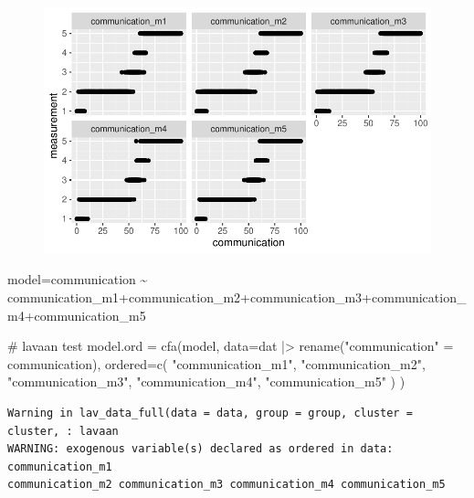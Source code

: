 \documentclass[
  letterpaper,
  DIV=11,
  numbers=noendperiod]{scrreprt}
\newenvironment{Shaded}{\begin{snugshade}}{\end{snugshade}}
\newcommand{\AttributeTok}[1]{\textcolor[rgb]{0.40,0.45,0.13}{#1}}
\newcommand{\CommentTok}[1]{\textcolor[rgb]{0.37,0.37,0.37}{#1}}
\newcommand{\FunctionTok}[1]{\textcolor[rgb]{0.28,0.35,0.67}{#1}}
\newcommand{\NormalTok}[1]{\textcolor[rgb]{0.00,0.23,0.31}{#1}}
\newcommand{\OtherTok}[1]{\textcolor[rgb]{0.00,0.23,0.31}{#1}}
\newcommand{\SpecialCharTok}[1]{\textcolor[rgb]{0.37,0.37,0.37}{#1}}
\newcommand{\StringTok}[1]{\textcolor[rgb]{0.13,0.47,0.30}{#1}}
\begin{document}
\begin{figure}[H]

{\centering \includegraphics{./latent-variable-regression_files/figure-pdf/unnamed-chunk-5-1.pdf}

}

\end{figure}

\begin{Shaded}
\begin{Highlighting}[]
\NormalTok{model}\OtherTok{=}\StringTok{\textquotesingle{}communication \textasciitilde{} communication\_m1+communication\_m2+communication\_m3+communication\_m4+communication\_m5\textquotesingle{}}

\CommentTok{\# lavaan test}
\NormalTok{model.ord }\OtherTok{=} \FunctionTok{cfa}\NormalTok{(model, }\AttributeTok{data=}\NormalTok{dat }\SpecialCharTok{|\textgreater{}} \FunctionTok{rename}\NormalTok{(}\StringTok{"communication"} \OtherTok{=}\NormalTok{ communication), }\AttributeTok{ordered=}\FunctionTok{c}\NormalTok{(}
    \StringTok{"communication\_m1"}\NormalTok{,}
    \StringTok{"communication\_m2"}\NormalTok{,}
    \StringTok{"communication\_m3"}\NormalTok{,}
    \StringTok{"communication\_m4"}\NormalTok{,}
    \StringTok{"communication\_m5"}
\NormalTok{    )   }
\NormalTok{)}
\end{Highlighting}
\end{Shaded}

\begin{verbatim}
Warning in lav_data_full(data = data, group = group, cluster = cluster, : lavaan
WARNING: exogenous variable(s) declared as ordered in data: communication_m1
communication_m2 communication_m3 communication_m4 communication_m5
\end{verbatim}
\end{document}
